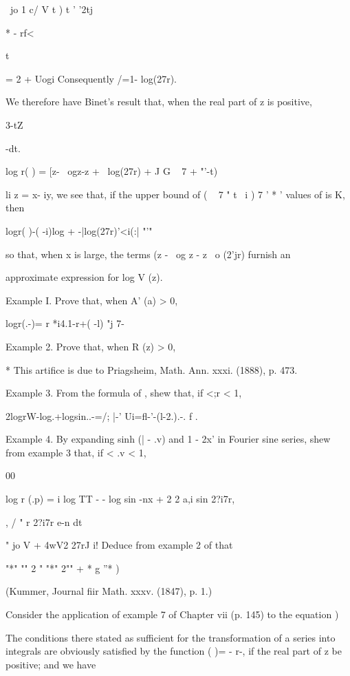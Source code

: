 ~jo 1 c/ V t ) t ' '2tj

* - rf<

t

= 2 + Uogi Consequently /=1- log(27r).

We therefore have Binet's result that, when the real part of z is
positive,

3-tZ

 -dt.

log r( ) = [z- \ ogz-z + \ log(27r) + J G ~ 7 + "'-t)

li z = x- iy, we see that, if the upper bound of ( ~ 7 " t \ i ) 7 ' *
' values of is K, then

logr( )-( -i)log + -|log(27r)'<i(:| "'"

so that, when x is large, the terms (z - \ og z - z \ o (2'jr) furnish
an

approximate expression for log V (z).

Example I. Prove that, when A' (a) > 0,

logr(.-)= r *i4.1-r+( -l) "j 7- 

Example 2. Prove that, when R (z) > 0,

* This artifice is due to Priagsheim, Math. Ann. xxxi. (1888), p. 473.

%
%

Example 3. From the formula of , shew that, if <;r < 1,

2logrW-log.+logsin..-=/; |-' Ui=fl-'-(l-2.).-. f .


Example 4. By expanding sinh (| - .v) and 1 - 2x' in Fourier sine
series, shew from example 3 that, if < .v < 1,

00

log r (.p) = i log TT - - log sin -nx + 2 2 a,i sin 2?i7r,

, / " r 2?i7r e-n dt

" jo V + 4wV2 27rJ i! Deduce from example 2 of  that

"*" "" 2 " "*" 2"" + * g ''* )

(Kummer, Journal fiir Math. xxxv. (1847), p. 1.)


Consider the application of example 7 of Chapter vii (p. 145) to the
equation )

The conditions there stated as sufficient for the transformation of a
series into integrals are obviously satisfied by the function ( )= -
r-, if the real part of z be positive; and we have

